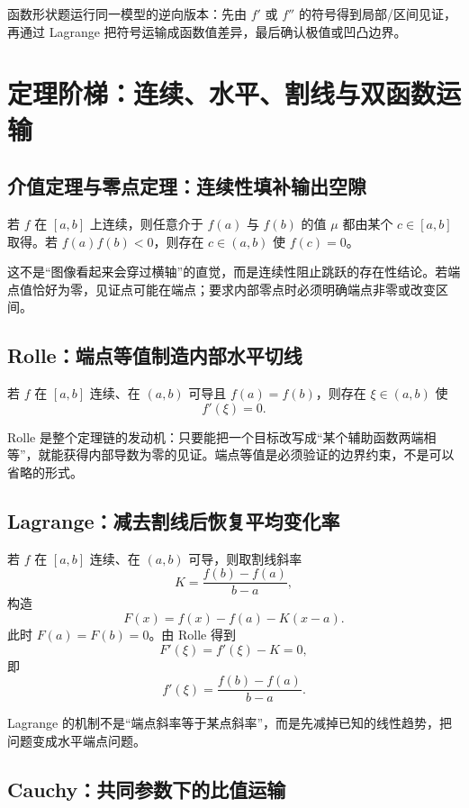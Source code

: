 \documentclass[UTF8,fontset=none,11pt,a4paper]{ctexart}
\begin{document}
函数形状题运行同一模型的逆向版本：先由 $f'$ 或 $f''$ 的符号得到局部/区间见证，再通过 Lagrange 把符号运输成函数值差异，最后确认极值或凹凸边界。

\section{定理阶梯：连续、水平、割线与双函数运输}

\subsection{介值定理与零点定理：连续性填补输出空隙}

若 $f$ 在 $[a,b]$ 上连续，则任意介于 $f(a)$ 与 $f(b)$ 的值 $\mu$ 都由某个 $c\in[a,b]$ 取得。若 $f(a)f(b)<0$，则存在 $c\in(a,b)$ 使 $f(c)=0$。

这不是“图像看起来会穿过横轴”的直觉，而是连续性阻止跳跃的存在性结论。若端点值恰好为零，见证点可能在端点；要求内部零点时必须明确端点非零或改变区间。

\subsection{Rolle：端点等值制造内部水平切线}

若 $f$ 在 $[a,b]$ 连续、在 $(a,b)$ 可导且 $f(a)=f(b)$，则存在 $\xi\in(a,b)$ 使
\[
f'(\xi)=0.
\]

Rolle 是整个定理链的发动机：只要能把一个目标改写成“某个辅助函数两端相等”，就能获得内部导数为零的见证。端点等值是必须验证的边界约束，不是可以省略的形式。

\subsection{Lagrange：减去割线后恢复平均变化率}

若 $f$ 在 $[a,b]$ 连续、在 $(a,b)$ 可导，则取割线斜率
\[
K=\frac{f(b)-f(a)}{b-a},
\]
构造
\[
F(x)=f(x)-f(a)-K(x-a).
\]
此时 $F(a)=F(b)=0$。由 Rolle 得到
\[
F'(\xi)=f'(\xi)-K=0,
\]
即
\[
\boxed{f'(\xi)=\frac{f(b)-f(a)}{b-a}}.
\]

Lagrange 的机制不是“端点斜率等于某点斜率”，而是先减掉已知的线性趋势，把问题变成水平端点问题。

\subsection{Cauchy：共同参数下的比值运输}
\end{document}
